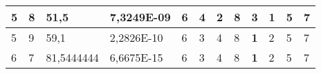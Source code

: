 \documentclass[conference]{IEEEtran}
\begin{document}
\begin{table*}[]
\begin{tabular}{|llll|llllllll|}
\multicolumn{1}{|l|}{5}                                                     & \multicolumn{1}{l|}{8}                                                        & \multicolumn{1}{l|}{51,5}                                                         & 7,3249E-09                     & \multicolumn{1}{l|}{6}                                                  & \multicolumn{1}{l|}{4}                                                  & \multicolumn{1}{l|}{2}                                                  & \multicolumn{1}{l|}{8}                                                  & \multicolumn{1}{l|}{3}                                                  & \multicolumn{1}{l|}{\textbf{1}}                                         & \multicolumn{1}{l|}{5}                                                  & 7                          \\ \hline
\multicolumn{1}{|l|}{5}                                                     & \multicolumn{1}{l|}{9}                                                        & \multicolumn{1}{l|}{59,1}                                                         & 2,2826E-10                     & \multicolumn{1}{l|}{6}                                                  & \multicolumn{1}{l|}{3}                                                  & \multicolumn{1}{l|}{4}                                                  & \multicolumn{1}{l|}{8}                                                  & \multicolumn{1}{l|}{\textbf{1}}                                         & \multicolumn{1}{l|}{2}                                                  & \multicolumn{1}{l|}{5}                                                  & 7                          \\ \hline
\multicolumn{1}{|l|}{6}                                                     & \multicolumn{1}{l|}{7}                                                        & \multicolumn{1}{l|}{81,5444444}                                                   & 6,6675E-15                     & \multicolumn{1}{l|}{6}                                                  & \multicolumn{1}{l|}{3}                                                  & \multicolumn{1}{l|}{4}                                                  & \multicolumn{1}{l|}{8}                                                  & \multicolumn{1}{l|}{\textbf{1}}                                         & \multicolumn{1}{l|}{2}                                                  & \multicolumn{1}{l|}{5}                                                  & 7                          \\ \hline

\end{tabular}
\end{table*}
\end{document}
